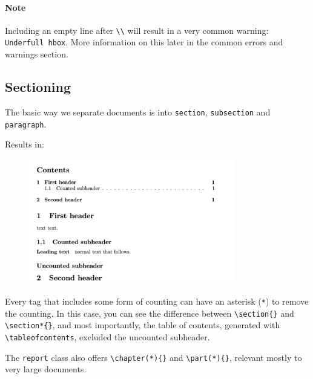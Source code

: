 \paragraph{Note} Including an empty line after \verb|\\| will result in a very common warning: \verb|Underfull hbox|. More information on this later in the common errors and warnings section.

\subsection{Sectioning}
The basic way we separate documents is into \verb|section|, \verb|subsection| and \verb|paragraph|.



Results in: 
\begin{figure}[h]
    \centering
    \includegraphics[width=0.8\textwidth]{figures/sections.png}
    \label{fig:sections}
\end{figure}

Every tag that includes some form of counting can have an asterisk (\verb|*|) to remove the counting.
In this case, you can see the difference between \verb|\section{}| and \verb|\section*{}|, and most importantly, the table of contents, generated with \verb|\tableofcontents|, excluded the uncounted subheader.

The \verb|report| class also offers \verb|\chapter(*){}| and \verb|\part(*){}|, relevant mostly to very large documents.

